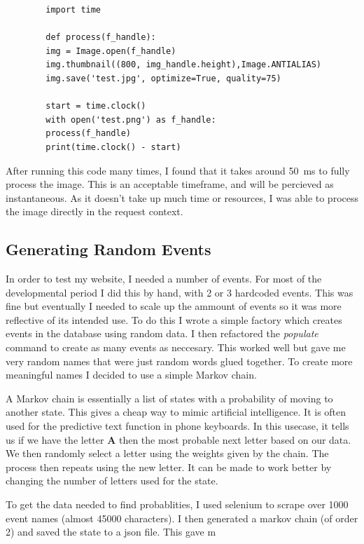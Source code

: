 \documentclass[a4paper,oneside,12pt,draft]{report}
\begin{document}
	\lstset{language=python}
	\begin{lstlisting}
		import time

		def process(f_handle):
		img = Image.open(f_handle)
		img.thumbnail((800, img_handle.height),Image.ANTIALIAS)
		img.save('test.jpg', optimize=True, quality=75)

		start = time.clock()
		with open('test.png') as f_handle:
		process(f_handle)
		print(time.clock() - start)
	\end{lstlisting}

	After running this code many times, I found that it takes around \SI{50}{\milli\second} to fully process the image. This is an acceptable timeframe, and will be percieved as instantaneous. As it doesn't take up much time or resources, I was able to process the image directly in the request context.

	\subsection{Generating Random Events}
	In order to test my website, I needed a number of events. For most of the developmental period I did this by hand, with 2 or 3 hardcoded events. This was fine but eventually I needed to scale up the ammount of events so it was more reflective of its intended use. To do this I wrote a simple factory which creates events in the database using random data. I then refactored the \textit{populate} command to create as many events as neccesary. This worked well but gave me very random names that were just random words glued together. To create more meaningful names I decided to use a simple Markov chain.

	A Markov chain is essentially a list of states with a probability of moving to another state. This gives a cheap way to mimic artificial intelligence. It is often used for the predictive text function in phone keyboards. In this usecase, it tells us if we have the letter \textbf{A} then the most probable next letter based on our data. We then randomly select a letter using the weights given by the chain. The process then repeats using the new letter. It can be made to work better by changing the number of letters used for the state.

	To get the data needed to find probablities, I used selenium to scrape over 1000 event names (almost 45000 characters). I then generated a markov chain (of order 2) and saved the state to a json file. This gave m
\end{document}
